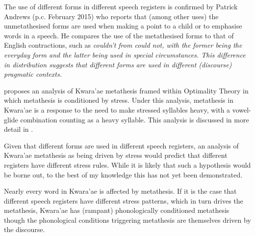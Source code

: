 The use of different forms in different speech registers is confirmed by Patrick Andrews
(p.c. February 2015)
who reports that (among other uses) the unmetathesised forms
are used when making a point to a child or to emphasise words in a speech.
He compares the use of the metathesised forms to that of English contractions,
such as \it{couldn't} from \it{could not},
with the former being the everyday form and the latter being used in special circumstances.
This difference in distribution suggests that different forms
are used in different (discourse) pragmatic contexts.

\cite{he04} proposes an analysis of Kwara'ae metathesis framed within Optimality Theory
in which metathesis is conditioned by stress.
Under this analysis, metathesis in Kwara'ae is a response
to the need to make stressed syllables heavy,
with a vowel-glide combination counting as a heavy syllable.
This analysis is discussed in more detail in .

Given that different forms are used in different speech registers,
an analysis of Kwara'ae metathesis as being driven by stress
would predict that different registers have different stress rules.
While it is likely that such a hypothesis would be borne out,
to the best of my knowledge this has not yet been demonstrated.

Nearly every word in Kwara'ae is affected by metathesis.
If it is the case that different speech registers have
different stress patterns, which in turn drives the metathesis,
Kwara'ae has (rampant) phonologically conditioned metathesis
though the phonological conditions triggering metathesis
are themselves driven by the discourse.
